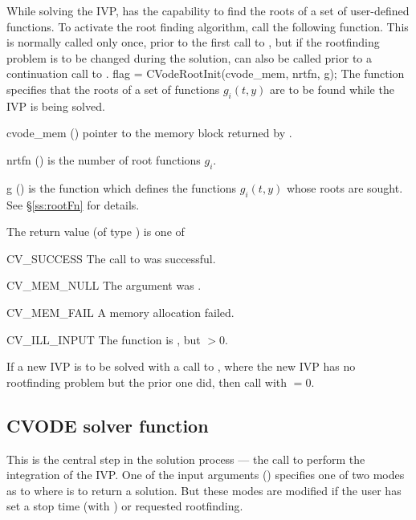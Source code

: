 While solving the IVP, {\cvode} has the capability to find the
roots of a set of user-defined functions. To activate the root finding
algorithm, call the following function.  This is normally called only
once, prior to the first call to , but if the rootfinding
problem is to be changed during the solution,  can also
be called prior to a continuation call to .
{
  flag = CVodeRootInit(cvode\_mem, nrtfn, g);
}
{
  The function  specifies that the roots of a set of
  functions $g_i(t,y)$ are to be found while the IVP is being solved.
}
{
  \begin{args}
  \item[cvode\_mem] ()
    pointer to the {\cvode} memory block returned by .
  \item[nrtfn] ()
    is the number of root functions $g_i$.
  \item[g] ()
    is the {\CC} function which defines the  functions $g_i(t,y)$
    whose roots are sought. See \S\ref{ss:rootFn} for details.
 \end{args}
}
{
  The return value  (of type ) is one of
  \begin{args}
  \item[CV\_SUCCESS]
    The call to  was successful.
  \item[CV\_MEM\_NULL]
    The  argument was .
  \item[CV\_MEM\_FAIL]
    A memory allocation failed.
  \item[CV\_ILL\_INPUT]
    The function  is , but  $ > 0$.
  \end{args}
}
{
  If a new IVP is to be solved with a call to , where the new
  IVP has no rootfinding problem but the prior one did, then call
   with $=0$.
}


\subsection{CVODE solver function}\label{sss:cvode}

This is the central step in the solution process --- the call to
perform the integration of the IVP.  One of the input arguments ()
specifies one of two modes as to where {\cvode} is to return a solution.
But these modes are modified if the user has set a stop time (with
) or requested rootfinding.

